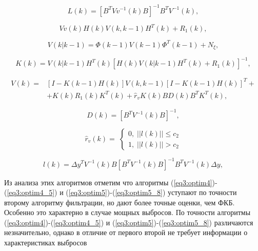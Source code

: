 \begin{equation}\label{eq3:optim5_1}
L(k)=[B^TVv^{-1}(k)B]^{-1}B^TV^{-1}(k),
\end{equation}

\begin{equation}\label{eq3:optim5_2}
Vv(k)H(k)V(k,k-1)H^T(k)+R_1(k),
\end{equation}

\begin{equation}\label{eq3:optim5_3}
V(k|k-1)=\Phi(k-1)V(k-1)\Phi^T(k-1)+N_\xi,
\end{equation}

\begin{equation}\label{eq3:optim5_4}
K(k)=V(k|k-1)H^T(k)[H(k)V(k|k-1)H^T(k)+R_1(k)]^{-1},
\end{equation}

\begin{equation}\label{eq3:optim5_5}
\begin{split}
V(k)=&[I-K(k-1)H(k)]V(k,k-1)[I-K(k-1)H(k)]^T+\\
&+K(k)R_1(k)K^T(k)+\hat{r}_vK(k)BD(k)B^TK^T(k),
\end{split}
\end{equation}

\begin{equation}\label{eq3:optim5_6}
D(k)=[B^TV^{-1}(k)B]^{-1},
\end{equation}

\begin{equation}\label{eq3:optim5_7}
\hat{r}_v(k)= \;
\begin{cases}
0, \; ||l(k)||\leq c_2 \\    
1, \; ||l(k)||> c_2    
\end{cases}
\end{equation}

\begin{equation}\label{eq3:optim5_8}
l(k)=\Delta y^TV^{-1}(k)B[B^TV^{-1}(k)B]^{-1}B^TV^{-1}(k)\Delta y,
\end{equation}

Из анализа этих алгоритмов \cite{Klekis} отметим что алгоритмы (\ref{eq3:optim4})-(\ref{eq3:optim4_5}) и (\ref{eq3:optim5})-(\ref{eq3:optim5_8}) уступают по точности второму алгоритму фильтрации, но дают более точные оценки, чем ФКБ.
Особенно это характерно в случае мощных выбросов.
По точности алгоритмы (\ref{eq3:optim4})-(\ref{eq3:optim4_5}) и (\ref{eq3:optim5})-(\ref{eq3:optim5_8}) различаются незначительно, однако в отличие от первого второй не требует информации о характеристиках выбросов


